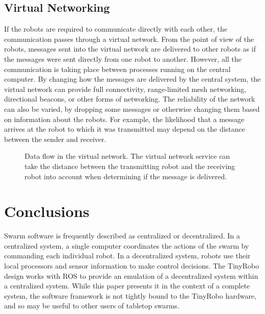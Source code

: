 \documentclass[]{article}
\begin{document}
\subsection{Virtual Networking}

If the robots are required to communicate directly with each other, the communication passes through a virtual network.
From the point of view of the robots, messages sent into the virtual network are delivered to other robots as if the messages were sent directly from one robot to another. 
However, all the communication is taking place between processes running on the central computer.
By changing how the messages are delivered by the central system, the virtual network can provide full connectivity, range-limited mesh networking, directional beacons, or other forms of networking. 
The reliability of the network can also be varied, by dropping some messages or otherwise changing them based on information about the robots. 
For example, the likelihood that a message arrives at the robot to which it was transmitted may depend on the distance between the sender and receiver. 

\begin{figure}
	\centering
	\caption{Data flow in the virtual network. The virtual network service can take the distance between the transmitting robot and the receiving robot into account when determining if the message is delivered.}
\end{figure}


\section{Conclusions}

Swarm software is frequently described as centralized or decentralized. 
In a centralized system, a single computer coordinates the actions of the swarm by commanding each individual robot. 
In a decentralized system, robots use their local processors and sensor information to make control decisions. 
The TinyRobo design works with ROS to provide an emulation of a decentralized system within a centralized system. 
While this paper presents it in the context of a complete system, the software framework is not tightly bound to the TinyRobo hardware, and so may be useful to other users of tabletop swarms. 
\end{document}

